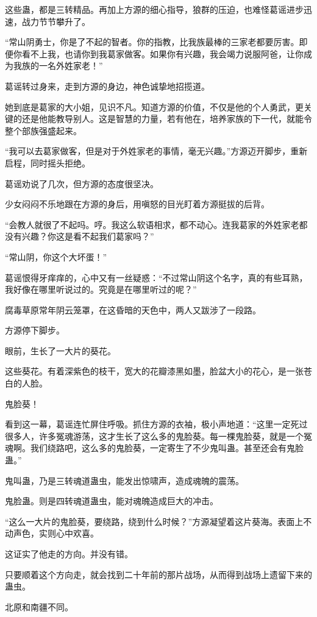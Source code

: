 \begin{this_body}
这些蛊，都是三转精品。再加上方源的细心指导，狼群的压迫，也难怪葛谣进步迅速，战力节节攀升了。

“常山阴勇士，你是了不起的智者。你的指教，比我族最棒的三家老都要厉害。即便你看不上我，也请你到我葛家做客。如果你有兴趣，我会竭力说服阿爸，让你成为我族的一名外姓家老！”

葛谣转过身来，走到方源的身边，神色诚挚地招揽道。

她到底是葛家的大小姐，见识不凡。知道方源的价值，不仅是他的个人勇武，更关键的还是他能教导别人。这是智慧的力量，若有他在，培养家族的下一代，就能令整个部族强盛起来。

“我可以去葛家做客，但是对于外姓家老的事情，毫无兴趣。”方源迈开脚步，重新启程，同时摇头拒绝。

葛谣劝说了几次，但方源的态度很坚决。

少女闷闷不乐地跟在方源的身后，用嗔怒的目光盯着方源挺拔的后背。

“会教人就很了不起吗。哼。我这么软语相求，都不动心。连我葛家的外姓家老都没有兴趣？你这是看不起我们葛家吗？”

“常山阴，你这个大坏蛋！”

葛谣恨得牙痒痒的，心中又有一丝疑惑：“不过常山阴这个名字，真的有些耳熟，我好像在哪里听说过的。究竟是在哪里听过的呢？”

腐毒草原常年阴云笼罩，在这昏暗的天色中，两人又跋涉了一段路。

方源停下脚步。

眼前，生长了一大片的葵花。

这些葵花。有着深紫色的枝干，宽大的花瓣漆黑如墨，脸盆大小的花心，是一张苍白的人脸。

鬼脸葵！

看到这一幕，葛谣连忙屏住呼吸。抓住方源的衣袖，极小声地道：“这里一定死过很多人，许多冤魂游荡，这才生长了这么多的鬼脸葵。每一棵鬼脸葵，就是一个冤魂啊。我们绕路吧，这么多的鬼脸葵，一定寄生了不少鬼叫蛊。甚至还会有鬼脸蛊。”

鬼叫蛊，乃是三转魂道蛊虫，能发出惊啸声，造成魂魄的震荡。

鬼脸蛊。则是四转魂道蛊虫，能对魂魄造成巨大的冲击。

“这么一大片的鬼脸葵，要绕路，绕到什么时候？”方源凝望着这片葵海。表面上不动声色，实则心中欢喜。

这证实了他走的方向。并没有错。

只要顺着这个方向走，就会找到二十年前的那片战场，从而得到战场上遗留下来的蛊虫。

北原和南疆不同。


\end{this_body}
